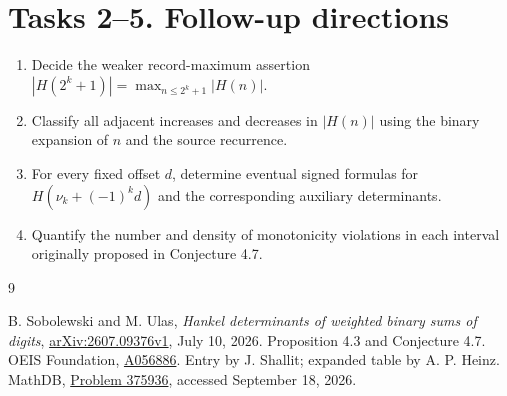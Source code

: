 \documentclass[11pt]{article}
\begin{document}
\section*{Tasks 2--5. Follow-up directions}
\begin{enumerate}[start=2,leftmargin=*]
\item Decide the weaker record-maximum assertion
$|H(2^k+1)|=\max_{n\le2^k+1}|H(n)|$.
\item Classify all adjacent increases and decreases in $|H(n)|$
using the binary expansion of $n$ and the source recurrence.
\item For every fixed offset $d$, determine eventual signed formulas
for $H(\nu_k+(-1)^kd)$ and the corresponding auxiliary determinants.
\item Quantify the number and density of monotonicity violations in
each interval originally proposed in Conjecture 4.7.
\end{enumerate}

\begin{thebibliography}{9}
\raggedright
{} B. Sobolewski and M. Ulas,
\emph{Hankel determinants of weighted binary sums of digits},
\href{https://arxiv.org/abs/2607.09376v1}{arXiv:2607.09376v1}, July 10, 2026.
Proposition 4.3 and Conjecture 4.7.
 OEIS Foundation, \href{https://oeis.org/A056886}{A056886}.
Entry by J. Shallit; expanded table by A. P. Heinz.
 MathDB, \href{https://mathdb.com/p/375936}{Problem 375936},
accessed September 18, 2026.
\end{thebibliography}
\end{document}
